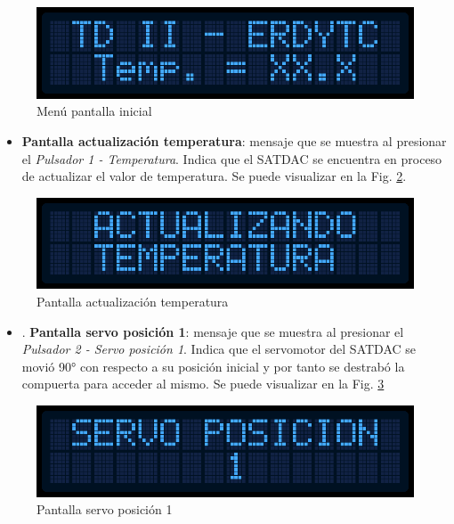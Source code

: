 \documentclass[conference]{IEEEtran}
\begin{document}
\begin{figure}[htbp]
\centering
\includegraphics[width=.9\linewidth]{../../images/pantallaInicial.png}
\caption{\label{fig:pantallaInicial}Menú pantalla inicial}
\end{figure}

\begin{itemize}
\item \textbf{Pantalla actualización temperatura}: mensaje que se muestra al presionar el \emph{Pulsador 1 - Temperatura}. Indica que el SATDAC se encuentra en proceso de actualizar el valor de temperatura. Se puede visualizar en la Fig. \ref{fig:pantallaTemperatura}.
\end{itemize}

\begin{figure}[htbp]
\centering
\includegraphics[width=.9\linewidth]{../../images/pantallaTemperatura.png}
\caption{\label{fig:pantallaTemperatura}Pantalla actualización temperatura}
\end{figure}

\begin{itemize}
\item . \textbf{Pantalla servo posición 1}: mensaje que se muestra al presionar el \emph{Pulsador 2 - Servo posición 1}. Indica que el servomotor del SATDAC se movió 90° con respecto a su posición inicial y por tanto se destrabó la compuerta para acceder al mismo. Se puede visualizar en la Fig. \ref{fig:pantallaServo1}
\end{itemize}

\begin{figure}[htbp]
\centering
\includegraphics[width=.9\linewidth]{../../images/pantallaServo1.png}
\caption{\label{fig:pantallaServo1}Pantalla servo posición 1}
\end{figure}
\end{document}
